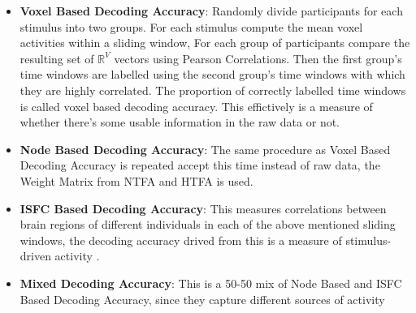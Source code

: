 \documentclass{article}
\begin{document}
\begin{itemize}
    \item \textbf{Voxel Based Decoding Accuracy}: Randomly divide participants for each stimulus into two groups. For each stimulus compute the mean voxel activities within a sliding window, For each group of participants compare the resulting set of $\mathbb{R}^V$ vectors using Pearson Correlations. Then the first group's time windows are labelled using the second group's time windows with which they are highly correlated. The proportion of correctly labelled time windows is called voxel based decoding accuracy. This effictively is a measure of whether there's some usable information in the raw data or not.
    
    \item \textbf{Node Based Decoding Accuracy}: The same procedure as Voxel Based Decoding Accuracy is repeated accept this time instead of raw data, the Weight Matrix from NTFA and HTFA is used.
    
    \item \textbf{ISFC Based Decoding Accuracy}: This measures correlations between brain regions of different individuals in each of the above mentioned sliding windows, the decoding accuracy drived from this is a measure of stimulus-driven activity \cite{HTFA}.
    
    \item \textbf{Mixed Decoding Accuracy}: This is a 50-50 mix of Node Based and ISFC Based Decoding Accuracy, since they capture different sources of activity \cite{HTFA}
    
\end{itemize}



 
\end{document}
